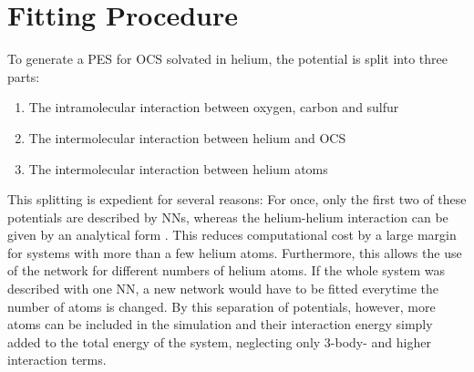 \documentclass[12pt,titlepage]{article}
\begin{document}
\section{Fitting Procedure}
\label{fitting procedure}
To generate a PES for OCS solvated in helium, the potential is split into three parts:
\begin{enumerate}
	\item The intramolecular interaction between oxygen, carbon and sulfur
	\item The intermolecular interaction between helium and OCS
	\item The intermolecular interaction between helium atoms
\end{enumerate}
This splitting is expedient for several reasons:
For once, only the first two of these potentials are described by NNs, whereas the helium-helium interaction can be given by an analytical form \cite{Aziz1995}. This reduces computational cost by a large margin for systems with more than a few helium atoms. Furthermore, this allows the use of the network for different numbers of helium atoms. If the whole system was described with one NN, a new network would have to be fitted everytime the number of atoms is changed.
By this separation of potentials, however, more atoms can be included in the simulation and their interaction energy simply added to the total energy of the system, neglecting only 3-body- and higher interaction terms.
\end{document}
